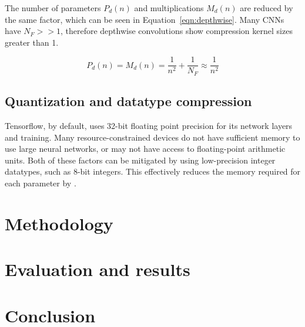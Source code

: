 \documentclass{article}
\begin{document}
	The number of parameters $P_d(n)$ and multiplications $M_d(n)$ are reduced by the same factor, which can be seen in Equation~\ref{eqn:depthwise}. Many CNNs have $N_F >> 1$, therefore depthwise convolutions show compression kernel sizes greater than 1. 

	\begin{equation} \label{eqn:depthwise}
		P_d(n) = M_d(n) = \frac{1}{n^2} + \frac{1}{N_F} \approx \frac{1}{n^2}
	\end{equation}
	
	
	\subsection{Quantization and datatype compression}
	
	Tensorflow, by default, uses 32-bit floating point precision for its network layers and training. Many resource-constrained devices do not have sufficient memory to use large neural networks, or may not have access to floating-point arithmetic units. Both of these factors can be mitigated by using low-precision integer datatypes, such as 8-bit integers. This effectively reduces the memory required for each parameter by . 
	
	
	\section{Methodology}
	
	\section{Evaluation and results}
	
	
	\section{Conclusion}
	
	
	
%	

	
\end{document}
